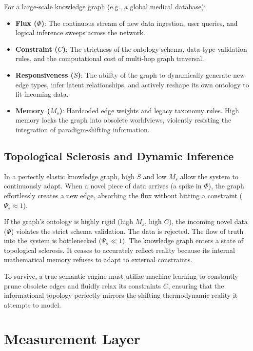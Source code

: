 \documentclass[11pt,a4paper]{article}
\begin{document}
For a large-scale knowledge graph (e.g., a global medical database):
\begin{itemize}
    \item \textbf{Flux ($\Phi$)}: The continuous stream of new data ingestion, user queries, and logical inference sweeps across the network.
    \item \textbf{Constraint ($C$)}: The strictness of the ontology schema, data-type validation rules, and the computational cost of multi-hop graph traversal.
    \item \textbf{Responsiveness ($S$)}: The ability of the graph to dynamically generate new edge types, infer latent relationships, and actively reshape its own ontology to fit incoming data.
    \item \textbf{Memory ($M_s$)}: Hardcoded edge weights and legacy taxonomy rules. High memory locks the graph into obsolete worldviews, violently resisting the integration of paradigm-shifting information.
\end{itemize}

\subsection{Topological Sclerosis and Dynamic Inference}
In a perfectly elastic knowledge graph, high $S$ and low $M_s$ allow the system to continuously adapt. When a novel piece of data arrives (a spike in $\Phi$), the graph effortlessly creates a new edge, absorbing the flux without hitting a constraint ($\Psi_s \approx 1$).

If the graph's ontology is highly rigid (high $M_s$, high $C$), the incoming novel data ($\Phi$) violates the strict schema validation. The data is rejected. The flow of truth into the system is bottlenecked ($\Psi_s \ll 1$). The knowledge graph enters a state of topological sclerosis. It ceases to accurately reflect reality because its internal mathematical memory refuses to adapt to external constraints.

To survive, a true semantic engine must utilize machine learning to constantly prune obsolete edges and fluidly relax its constraints $C$, ensuring that the informational topology perfectly mirrors the shifting thermodynamic reality it attempts to model.



\section{Measurement Layer}
\end{document}
